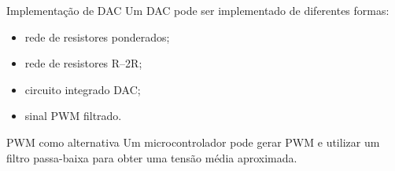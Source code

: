 \begin{frame}{Implementação de DAC}
    Um DAC pode ser implementado de diferentes formas:

    \begin{itemize}
        \item rede de resistores ponderados;
        \item rede de resistores R--2R;
        \item circuito integrado DAC;
        \item sinal PWM filtrado.
    \end{itemize}

    \begin{alertblock}{PWM como alternativa}
        Um microcontrolador pode gerar PWM e utilizar um filtro passa-baixa
        para obter uma tensão média aproximada.
    \end{alertblock}
\end{frame}
